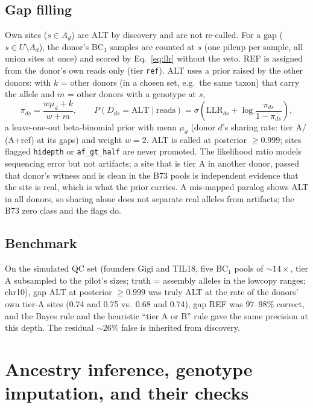 \documentclass[11pt]{article}
\newcommand{\ALT}{\mathrm{ALT}}
\newcommand{\LLR}{\mathrm{LLR}}
\newcommand{\code}[1]{\texttt{#1}}
\begin{document}
\subsection{Gap filling}
Own sites ($s\in A_d$) are ALT by discovery and are not re-called. For a gap ($s\in U\setminus A_d$), the donor's BC$_1$ samples are counted
at $s$ (one pileup per sample, all union sites at once) and scored by Eq.~\eqref{eq:llr} without the veto. REF is assigned from the donor's
own reads only (tier \code{ref}). ALT uses a prior raised by the other donors: with $k$ = other donors (in a chosen set, e.g.\ the same
taxon) that carry the allele and $m$ = other donors with a genotype at $s$,
\begin{equation}
\pi_{ds}=\frac{w\mu_d+k}{w+m},\qquad
P(D_{ds}=\ALT\mid\text{reads})=\sigma\!\left(\LLR_{ds}+\log\frac{\pi_{ds}}{1-\pi_{ds}}\right),
\label{eq:eb}
\end{equation}
a leave-one-out beta-binomial prior with mean $\mu_d$ (donor $d$'s sharing rate: tier A$/$(A$+$ref) at its gaps) and weight $w=2$.
ALT is called at posterior $\ge0.999$; sites flagged \code{hidepth} or \code{af\_gt\_half} are never promoted.
The likelihood ratio models sequencing error but not artifacts; a site that is tier A in another donor, passed that donor's witness and is
clean in the B73 pools is independent evidence that the site is real, which is what the prior carries. A mis-mapped paralog shows ALT in all
donors, so sharing alone does not separate real alleles from artifacts; the B73 zero class and the flags do.

\subsection{Benchmark}
On the simulated QC set (founders Gigi and TIL18, five BC$_1$ pools of $\sim14\times$, tier A subsampled to the pilot's sizes; truth =
assembly alleles in the lowcopy ranges; chr10), gap ALT at posterior $\ge0.999$ was truly ALT at the rate of the donors' own tier-A sites
(0.74 and 0.75 vs.\ 0.68 and 0.74), gap REF was $97$--$98\%$ correct, and the Bayes rule and the heuristic ``tier A or B'' rule gave the
same precision at this depth. The residual $\sim26\%$ false is inherited from discovery.

\section{Ancestry inference, genotype imputation, and their checks}
\label{sec:checks}
\end{document}
